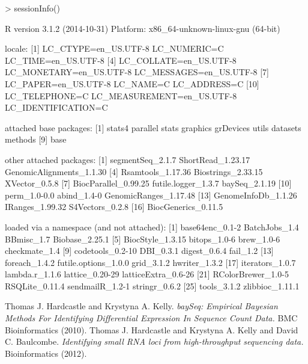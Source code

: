 \documentclass[a4paper]{article}
\begin{document}
\begin{Schunk}
\begin{Sinput}
> sessionInfo()
\end{Sinput}
\begin{Soutput}
R version 3.1.2 (2014-10-31)
Platform: x86_64-unknown-linux-gnu (64-bit)

locale:
 [1] LC_CTYPE=en_US.UTF-8       LC_NUMERIC=C               LC_TIME=en_US.UTF-8       
 [4] LC_COLLATE=en_US.UTF-8     LC_MONETARY=en_US.UTF-8    LC_MESSAGES=en_US.UTF-8   
 [7] LC_PAPER=en_US.UTF-8       LC_NAME=C                  LC_ADDRESS=C              
[10] LC_TELEPHONE=C             LC_MEASUREMENT=en_US.UTF-8 LC_IDENTIFICATION=C       

attached base packages:
[1] stats4    parallel  stats     graphics  grDevices utils     datasets  methods  
[9] base     

other attached packages:
 [1] segmentSeq_2.1.7         ShortRead_1.23.17        GenomicAlignments_1.1.30
 [4] Rsamtools_1.17.36        Biostrings_2.33.15       XVector_0.5.8           
 [7] BiocParallel_0.99.25     futile.logger_1.3.7      baySeq_2.1.19           
[10] perm_1.0-0.0             abind_1.4-0              GenomicRanges_1.17.48   
[13] GenomeInfoDb_1.1.26      IRanges_1.99.32          S4Vectors_0.2.8         
[16] BiocGenerics_0.11.5     

loaded via a namespace (and not attached):
 [1] base64enc_0.1-2      BatchJobs_1.4        BBmisc_1.7           Biobase_2.25.1      
 [5] BiocStyle_1.3.15     bitops_1.0-6         brew_1.0-6           checkmate_1.4       
 [9] codetools_0.2-10     DBI_0.3.1            digest_0.6.4         fail_1.2            
[13] foreach_1.4.2        futile.options_1.0.0 grid_3.1.2           hwriter_1.3.2       
[17] iterators_1.0.7      lambda.r_1.1.6       lattice_0.20-29      latticeExtra_0.6-26 
[21] RColorBrewer_1.0-5   RSQLite_0.11.4       sendmailR_1.2-1      stringr_0.6.2       
[25] tools_3.1.2          zlibbioc_1.11.1     
\end{Soutput}
\end{Schunk}

\begin{thebibliography}{99}
 Thomas J. Hardcastle and Krystyna A. Kelly. \textsl{baySeq: Empirical Bayesian Methods For Identifying Differential Expression In Sequence Count Data.} BMC Bioinformatics (2010).
 Thomas J. Hardcastle and Krystyna A. Kelly and David C. Baulcombe. \textsl{Identifying small RNA loci from high-throughput sequencing data.} Bioinformatics (2012).

\end{thebibliography}
\end{document}
